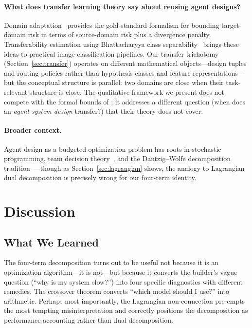 \documentclass[twoside,11pt]{article}
\begin{document}
\paragraph{What does transfer learning theory say about reusing agent designs?}
Domain adaptation~\citep{bendavid2010theory} provides the gold-standard formalism for bounding target-domain risk in terms of source-domain risk plus a divergence penalty.
Transferability estimation using Bhattacharyya class separability~\citep{pandy2022gbc} brings these ideas to practical image-classification pipelines.
Our transfer trichotomy (Section~\ref{sec:transfer}) operates on different mathematical objects---design tuples and routing policies rather than hypothesis classes and feature representations---but the conceptual structure is parallel: two domains are close when their task-relevant structure is close.
The qualitative framework we present does not compete with the formal bounds of \citet{bendavid2010theory}; it addresses a different question (when does an \emph{agent system design} transfer?) that their theory does not cover.

\paragraph{Broader context.}
Agent design as a budgeted optimization problem has roots in stochastic programming, team decision theory~\citep{multiagentfinance2026}, and the Dantzig--Wolfe decomposition tradition~\citep{dantzigwolfe1960,fisher2004lagrangian}---though as Section~\ref{sec:lagrangian} shows, the analogy to Lagrangian dual decomposition is precisely wrong for our four-term identity.

\section{Discussion}
\label{sec:discussion}

\subsection{What We Learned}

The four-term decomposition turns out to be useful not because it is an optimization algorithm---it is not---but because it converts the builder's vague question (``why is my system slow?'') into four specific diagnostics with different remedies.
The crossover theorem converts ``which model should I use?'' into arithmetic.
Perhaps most importantly, the Lagrangian non-connection pre-empts the most tempting misinterpretation and correctly positions the decomposition as performance accounting rather than dual decomposition.
\end{document}

